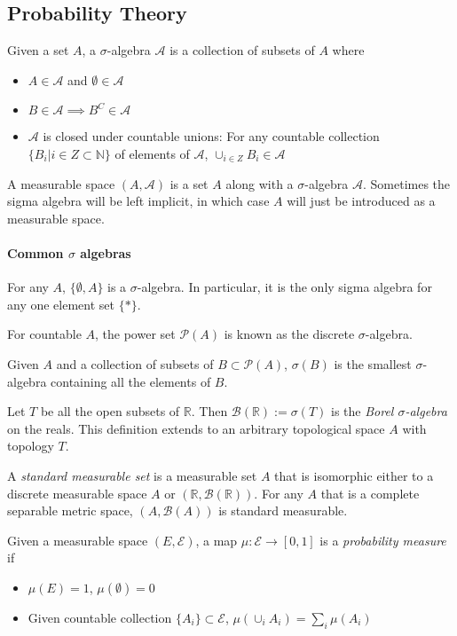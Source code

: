 \subsection{Probability Theory}

Given a set $A$, a $\sigma$-algebra $\mathcal{A}$ is a collection of subsets of $A$ where
\begin{itemize}
	\item $A\in \mathcal{A}$ and $\emptyset\in \mathcal{A}$
	\item $B\in \mathcal{A}\implies B^C\in\mathcal{A}$
	\item $\mathcal{A}$ is closed under countable unions: For any countable collection $\{B_i|i\in Z\subset \mathbb{N}\}$ of elements of $\mathcal{A}$, $\cup_{i\in Z}B_i\in \mathcal{A}$ 
\end{itemize}

A measurable space $(A,\mathcal{A})$ is a set $A$ along with a $\sigma$-algebra $\mathcal{A}$. Sometimes the sigma algebra will be left implicit, in which case $A$ will just be introduced as a measurable space.

\paragraph{Common $\sigma$ algebras}

For any $A$, $\{\emptyset,A\}$ is a $\sigma$-algebra. In particular, it is the only sigma algebra for any one element set $\{*\}$.

For countable $A$, the power set $\mathscr{P}(A)$ is known as the discrete $\sigma$-algebra.

Given $A$ and a collection of subsets of $B\subset\mathscr{P}(A)$, $\sigma(B)$ is the smallest $\sigma$-algebra containing all the elements of $B$. 

Let $T$ be all the open subsets of $\mathbb{R}$. Then $\mathcal{B}(\mathbb{R}):=\sigma(T)$ is the \emph{Borel $\sigma$-algebra} on the reals. This definition extends to an arbitrary topological space $A$ with topology $T$.

A \emph{standard measurable set} is a measurable set $A$ that is isomorphic either to a discrete measurable space $A$ or $(\mathbb{R}, \mathcal{B}(\mathbb{R}))$. For any $A$ that is a complete separable metric space, $(A,\mathcal{B}(A))$ is standard measurable. 

Given a measurable space $(E,\mathcal{E})$, a map $\mu:\mathcal{E}\to [0,1]$ is a \emph{probability measure} if
\begin{itemize}
	\item $\mu(E)=1$, $\mu(\emptyset)=0$
	\item Given countable collection $\{A_i\}\subset\mathscr{E}$, $\mu(\cup_{i} A_i) = \sum_i \mu(A_i)$
\end{itemize}

